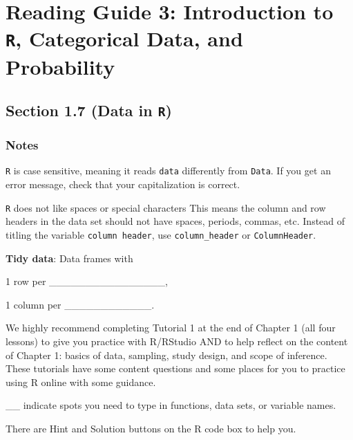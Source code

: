 \documentclass[
]{report}
\newcommand{\rgi}{\hspace{24pt}}  %
\begin{document}
\hypertarget{reading-guide-3-introduction-to-r-categorical-data-and-probability}{%
\chapter{\texorpdfstring{Reading Guide 3: Introduction to \texttt{R}, Categorical Data, and Probability}{Reading Guide 3: Introduction to R, Categorical Data, and Probability}}\label{reading-guide-3-introduction-to-r-categorical-data-and-probability}}


\hypertarget{section-1.7-data-in-r}{%
\section*{\texorpdfstring{Section 1.7 (Data in \texttt{R})}{Section 1.7 (Data in R)}}\label{section-1.7-data-in-r}}

\hypertarget{notes}{%
\subsection*{Notes}\label{notes}}

\texttt{R} is case sensitive, meaning it reads \texttt{data} differently from \texttt{Data}. If you get an error message, check that your capitalization is correct.

\texttt{R} does not like spaces or special characters This means the column and row headers in the data set should not have spaces, periods, commas, etc. Instead of titling the variable \texttt{column\ header}, use \texttt{column\_header} or \texttt{ColumnHeader}.

\textbf{Tidy data}: Data frames with

\rgi 1 row per \_\_\_\_\_\_\_\_\_\_\_\_\_\_\_\_,

\rgi 1 column per \_\_\_\_\_\_\_\_\_\_\_\_.

We highly recommend completing Tutorial 1 at the end of Chapter 1 (all four lessons) to give you practice with R/RStudio AND to help reflect on the content of Chapter 1: basics of data, sampling, study design, and scope of inference. These tutorials have some content questions and some places for you to practice using R online with some guidance.

\rgi \_\_ indicate spots you need to type in functions, data sets, or variable names.

\rgi There are Hint and Solution buttons on the R code box to help you.
\end{document}
